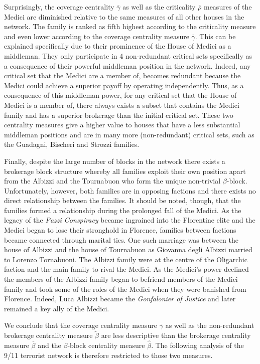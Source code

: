 Surprisingly, the coverage centrality $\overline{\gamma}$ as well as the criticality $\overline{\rho}$ measures of the Medici are diminished relative to the same measures of all other houses in the network. The family is ranked as fifth highest according to the criticality measure and even lower according to the coverage centrality measure $\overline{\gamma}$. This can be explained specifically due to their prominence of the House of Medici as a middleman. They only participate in 4 non-redundant critical sets specifically as a consequence of their powerful middleman position in the network. Indeed, any critical set that the Medici are a member of, becomes redundant because the Medici could achieve a superior payoff by operating independently. Thus, as a consequence of this middleman power, for any critical set that the House of Medici is a member of, there always exists a subset that contains the Medici family and has a superior brokerage than the initial critical set. These two centrality measures give a higher value to houses that have a less substantial middleman positions and are in many more (non-redundant) critical sets, such as the Guadagni, Bischeri and Strozzi families.

Finally, despite the large number of blocks in the network there exists a brokerage block structure whereby all families exploit their own position apart from the Albizzi and the Tournabuon who form the unique non-trivial $\beta$-block. Unfortunately, however, both families are in opposing factions and there exists no direct relationship between the families. It should be noted, though, that the families formed a relationship during the prolonged fall of the Medici. As the legacy of the \textit{Pazzi Conspiracy} became ingrained into the Florentine elite and the Medici began to lose their stronghold in Florence, families between factions became connected through marital ties. One such marriage was between the house of Albizzi and the house of Tournabuon as Giovanna degli Albizzi married to Lorenzo Tornabuoni. The Albizzi family were at the centre of the Oligarchic faction and the main family to rival the Medici. As the Medici's power declined the members of the Albizzi family began to befriend members of the Medici family and took some of the roles of the Medici when they were banished from Florence. Indeed, Luca Albizzi became the \textit{Gonfalonier of Justice} and later remained a key ally of the Medici.

We conclude that the coverage centrality measure $\overline{\gamma}$ as well as the non-redundant brokerage centrality measure $\widetilde{\beta}$ are less descriptive than the brokerage centrality measure $\overline{\beta}$ and the $\beta$-block centrality measure $\widehat{\beta}$. The following analysis of the 9/11 terrorist network is therefore restricted to those two measures.

